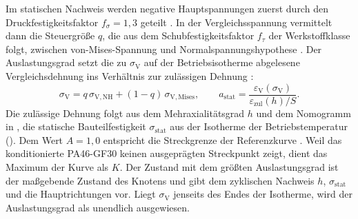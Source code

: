 Im statischen Nachweis werden negative Hauptspannungen zuerst durch den Druckfestigkeitsfaktor $f_{\sigma} = 1{,}3$ geteilt \cite[S.~357]{Sto18}. In der Vergleichsspannung vermittelt dann die Steuergröße $q$, die aus dem Schubfestigkeitsfaktor $f_{\tau}$ der Werkstoffklasse folgt, zwischen von-Mises-Spannung und Normalspannungshypothese \cite[S.~322 und 357]{Sto18}. Der Auslastungsgrad setzt die zu $\sigma_{\mathrm{V}}$ auf der Betriebsisotherme abgelesene Vergleichsdehnung ins Verhältnis zur zulässigen Dehnung \cite[S.~355]{Sto18}:
\begin{equation}
    \sigma_{\mathrm{V}} = q\,\sigma_{\mathrm{V,NH}} + (1 - q)\,\sigma_{\mathrm{V,Mises}} , \qquad
    a_{\mathrm{stat}} = \frac{\varepsilon_{\mathrm{V}}(\sigma_{\mathrm{V}})}{\varepsilon_{\mathrm{zul}}(h)/S} .
    \label{eq:a_stat}
\end{equation}
Die zulässige Dehnung folgt aus dem Mehraxialitätsgrad $h$ und dem Nomogramm in , die statische Bauteilfestigkeit $\sigma_{\mathrm{stat}}$ aus der Isotherme der Betriebstemperatur (). Dem Wert $A = 1{,}0$ entspricht die Streckgrenze der Referenzkurve \cite[S.~346 und 349]{Sto18}. Weil das konditionierte PA46-GF30 keinen ausgeprägten Streckpunkt zeigt, dient das Maximum der Kurve als $K$. Der Zustand mit dem größten Auslastungsgrad ist der maßgebende Zustand des Knotens und gibt dem zyklischen Nachweis $h$, $\sigma_{\mathrm{stat}}$ und die Hauptrichtungen vor. Liegt $\sigma_{\mathrm{V}}$ jenseits des Endes der Isotherme, wird der Auslastungsgrad als unendlich ausgewiesen.

